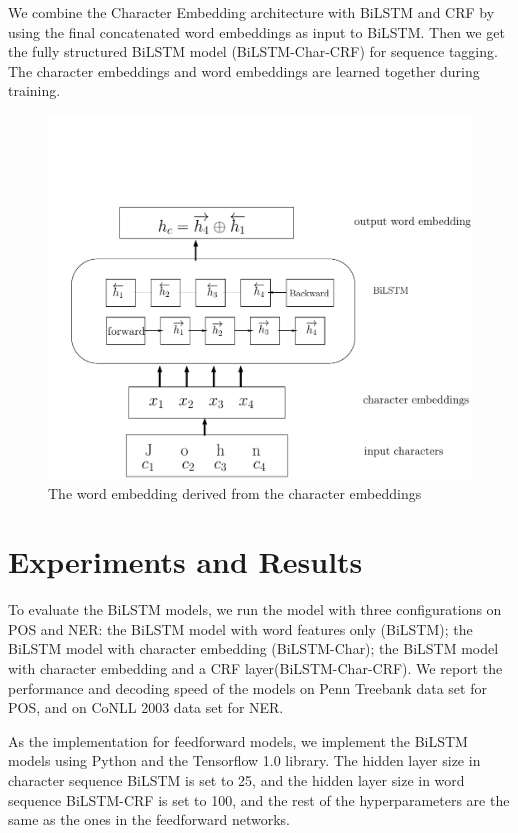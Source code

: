 \documentclass{sfuthesis}
\begin{document}
We combine the Character Embedding architecture with BiLSTM and CRF by using the final concatenated word embeddings as input to BiLSTM. Then we get the fully structured BiLSTM model (BiLSTM-Char-CRF) for sequence tagging. The character embeddings and word embeddings are learned together during training.

\begin{figure}
  \centering
  \includegraphics[scale=0.6]{bilstmchar.pdf}
 \caption{The word embedding derived from the character embeddings}
  \label{fig:charlstm}
\end{figure}


 
\section{Experiments and Results}

To evaluate the BiLSTM models, we run the model with three configurations on POS and NER: the BiLSTM model with word features only (BiLSTM); the BiLSTM model with character embedding (BiLSTM-Char); the BiLSTM model with character embedding and a CRF layer(BiLSTM-Char-CRF). We report the performance and decoding speed of the models on Penn Treebank data set for POS, and on CoNLL 2003 data set for NER. 

As the implementation for feedforward models, we implement the BiLSTM models using Python and the Tensorflow 1.0 library. The hidden layer size in character sequence BiLSTM is set to 25, and the hidden layer size in word sequence BiLSTM-CRF is set to 100, and the rest of the hyperparameters are the same as the ones in the feedforward networks.
\end{document}

